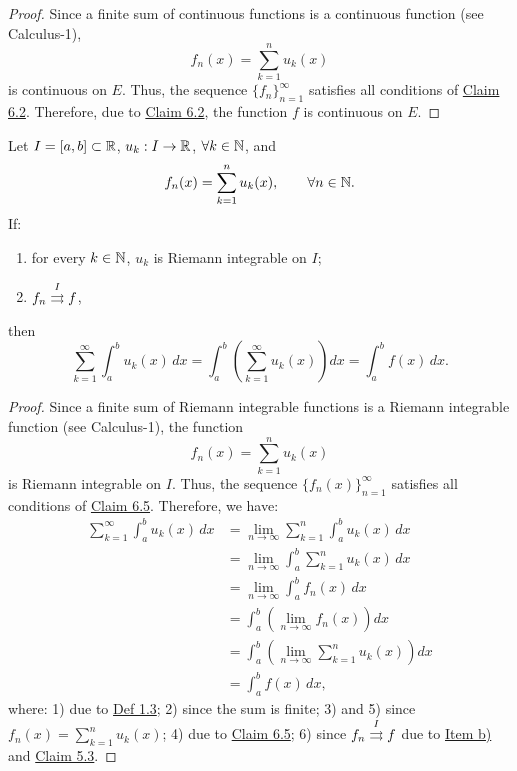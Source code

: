 \begin{proof}
Since a finite sum of continuous functions is a continuous function (see Calculus-1),
\[
f_n(x)=\sum_{k=1}^{n}u_k(x)
\]
is continuous on $E$. Thus, the sequence $\{f_n\}_{n=1}^{\infty}$ satisfies all conditions of \hyperref[claim:6.2]{Claim 6.2}. Therefore, due to \hyperref[claim:6.2]{Claim 6.2}, the function $f$ is continuous on $E$.
\end{proof}

\begin{claim}\label{claim:6.12}
Let $I=[a,b]\subset\mathbb{R}$, $u_k:I\to\mathbb{R}$, $\forall k\in\mathbb{N}$, and
\[
f_n(x)=\sum_{k=1}^{n}u_k(x),\qquad \forall n\in\mathbb{N}.
\]
If:
\begin{enumerate}[label=\alph*)]
    \item\label{item:claim:6.12:a} for every $k\in\mathbb{N}$, $u_k$ is Riemann integrable on $I$;
    \item\label{item:claim:6.12:b} $f_n\mathrel{\overset{I}{\rightrightarrows}}f$,
\end{enumerate}
then
\[
\sum_{k=1}^{\infty}\int_a^b u_k(x)\,dx
=
\int_a^b\left(\sum_{k=1}^{\infty}u_k(x)\right)dx
=
\int_a^b f(x)\,dx.
\]
\end{claim}

\begin{proof}
Since a finite sum of Riemann integrable functions is a Riemann integrable function (see Calculus-1), the function
\[
f_n(x)=\sum_{k=1}^{n}u_k(x)
\]
is Riemann integrable on $I$. Thus, the sequence $\{f_n(x)\}_{n=1}^{\infty}$ satisfies all conditions of \hyperref[claim:6.5]{Claim 6.5}. Therefore, we have:
\begin{align*}
\sum_{k=1}^{\infty}\int_a^b u_k(x)\,dx
&=\lim_{n\to\infty}\sum_{k=1}^{n}\int_a^b u_k(x)\,dx\\
&=\lim_{n\to\infty}\int_a^b\sum_{k=1}^{n}u_k(x)\,dx\\
&=\lim_{n\to\infty}\int_a^b f_n(x)\,dx\\
&=\int_a^b\left(\lim_{n\to\infty}f_n(x)\right)dx\\
&=\int_a^b\left(\lim_{n\to\infty}\sum_{k=1}^{n}u_k(x)\right)dx\\
&=\int_a^b f(x)\,dx,
\end{align*}
where: 1) due to \hyperref[def:1.3]{Def 1.3}; 2) since the sum is finite; 3) and 5) since $f_n(x)=\sum_{k=1}^{n}u_k(x)$; 4) due to \hyperref[claim:6.5]{Claim 6.5}; 6) since $f_n\mathrel{\overset{I}{\rightrightarrows}}f$ due to \hyperref[item:claim:6.12:b]{Item b)} and \hyperref[claim:5.3]{Claim 5.3}.
\end{proof}

